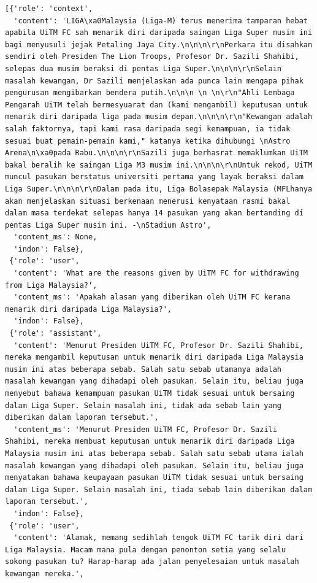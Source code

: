 \documentclass[preprint]{article}
\begin{document}
\begin{lstlisting}[breaklines=true]
  [{'role': 'context',
  'content': 'LIGA\xa0Malaysia (Liga-M) terus menerima tamparan hebat apabila UiTM FC sah menarik diri daripada saingan Liga Super musim ini bagi menyusuli jejak Petaling Jaya City.\n\n\n\r\nPerkara itu disahkan sendiri oleh Presiden The Lion Troops, Profesor Dr. Sazili Shahibi, selepas dua musim beraksi di pentas Liga Super.\n\n\n\r\nSelain masalah kewangan, Dr Sazili menjelaskan ada punca lain mengapa pihak pengurusan mengibarkan bendera putih.\n\n\n \n \n\r\n"Ahli Lembaga Pengarah UiTM telah bermesyuarat dan (kami mengambil) keputusan untuk menarik diri daripada liga pada musim depan.\n\n\n\r\n"Kewangan adalah salah faktornya, tapi kami rasa daripada segi kemampuan, ia tidak sesuai buat pemain-pemain kami," katanya ketika dihubungi \nAstro Arena\n\xa0pada Rabu.\n\n\n\r\nSazili juga berhasrat memaklumkan UiTM bakal beralih ke saingan Liga M3 musim ini.\n\n\n\r\nUntuk rekod, UiTM muncul pasukan berstatus universiti pertama yang layak beraksi dalam Liga Super.\n\n\n\r\nDalam pada itu, Liga Bolasepak Malaysia (MFLhanya akan menjelaskan situasi berkenaan menerusi kenyataan rasmi bakal dalam masa terdekat selepas hanya 14 pasukan yang akan bertanding di pentas Liga Super musim ini. -\nStadium Astro',
  'content_ms': None,
  'indon': False},
 {'role': 'user',
  'content': 'What are the reasons given by UiTM FC for withdrawing from Liga Malaysia?',
  'content_ms': 'Apakah alasan yang diberikan oleh UiTM FC kerana menarik diri daripada Liga Malaysia?',
  'indon': False},
 {'role': 'assistant',
  'content': 'Menurut Presiden UiTM FC, Profesor Dr. Sazili Shahibi, mereka mengambil keputusan untuk menarik diri daripada Liga Malaysia musim ini atas beberapa sebab. Salah satu sebab utamanya adalah masalah kewangan yang dihadapi oleh pasukan. Selain itu, beliau juga menyebut bahawa kemampuan pasukan UiTM tidak sesuai untuk bersaing dalam Liga Super. Selain masalah ini, tidak ada sebab lain yang diberikan dalam laporan tersebut.',
  'content_ms': 'Menurut Presiden UiTM FC, Profesor Dr. Sazili Shahibi, mereka membuat keputusan untuk menarik diri daripada Liga Malaysia musim ini atas beberapa sebab. Salah satu sebab utama ialah masalah kewangan yang dihadapi oleh pasukan. Selain itu, beliau juga menyatakan bahawa keupayaan pasukan UiTM tidak sesuai untuk bersaing dalam Liga Super. Selain masalah ini, tiada sebab lain diberikan dalam laporan tersebut.',
  'indon': False},
 {'role': 'user',
  'content': 'Alamak, memang sedihlah tengok UiTM FC tarik diri dari Liga Malaysia. Macam mana pula dengan penonton setia yang selalu sokong pasukan tu? Harap-harap ada jalan penyelesaian untuk masalah kewangan mereka.',

\end{lstlisting}
\end{document}
